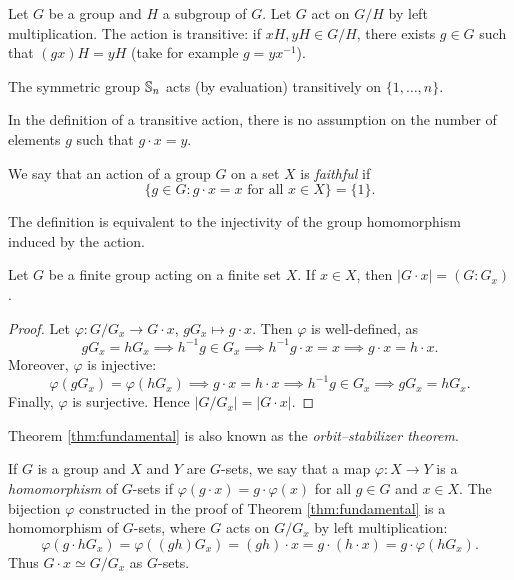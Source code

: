 \begin{example}
    Let $G$ be a group and $H$ a subgroup of $G$. Let $G$ act
    on $G/H$ by left multiplication. The action is transitive: if 
    $xH,yH\in G/H$, there exists $g\in G$ such that
    $(gx)H=yH$ (take for example $g=yx^{-1}$). 
\end{example}

\begin{example}
The symmetric group $\mathbb{S}_n$ acts (by evaluation) transitively 
on $\{1,\dots,n\}$.
\end{example}

In the definition of a transitive action, there is no assumption
on the number of elements $g$ such that $g\cdot x=y$.

\begin{definition}
We say that an action of a group $G$ on a set 
$X$ is \emph{faithful} if 
\[
\{g\in G:g\cdot x=x\text{ for all $x\in X$}\}=\{1\}.
\]
\end{definition}

The definition is equivalent to the injectivity of 
the group homomorphism induced
by the action. 

\begin{theorem}
\label{thm:fundamental}
Let $G$ be a finite group acting on a finite set $X$. If 
$x\in X$, then $|G\cdot x|=(G:G_x)$.
\end{theorem}

\begin{proof}
    Let $\varphi\colon G/G_x\to G\cdot x$, $gG_x\mapsto g\cdot x$. Then $\varphi$ is well-defined, as 
        \[
        gG_x=hG_x\implies h^{-1}g\in G_x
        \implies h^{-1}g\cdot x=x\implies g\cdot x=h\cdot x.
        \]
    Moreover, $\varphi$ is injective: 
        \[
        \varphi(gG_x)=\varphi(hG_x)\implies
        g\cdot x=h\cdot x\implies
        h^{-1}g\in G_x\implies gG_x=hG_x.
        \]
    Finally, $\varphi$ is surjective. Hence 
    $|G/G_x|=|G\cdot x|$.
\end{proof}

Theorem \ref{thm:fundamental} is also known 
as the \emph{orbit--stabilizer theorem}. 

\begin{optional}
If $G$ is a group and $X$ and $Y$ are $G$-sets, 
we say that a map $\varphi\colon X\to Y$ is a 
\emph{homomorphism} of $G$-sets if $\varphi(g\cdot x)=g\cdot \varphi(x)$ for all $g\in G$ and $x\in X$. The bijection 
$\varphi$ constructed in the proof of Theorem \ref{thm:fundamental}
is a homomorphism of $G$-sets, where
$G$ acts on $G/G_x$ by left multiplication: 
\[
\varphi(g\cdot hG_x)=\varphi((gh)G_x)=(gh)\cdot x=g\cdot (h\cdot x)=g\cdot\varphi(hG_x).
\]
Thus $G\cdot x\simeq G/G_x$ as $G$-sets.
\end{optional}

